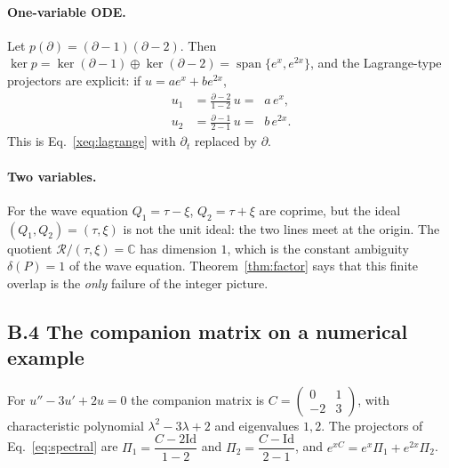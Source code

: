 \documentclass[11pt]{article}
\theoremstyle{plain}
\theoremstyle{definition}
\theoremstyle{remark}
\newcommand{\C}{\mathbb{C}}
\newcommand{\ring}{\mathcal{R}}            %
\DeclareMathOperator{\spn}{span}
\newcommand{\Id}{\mathrm{Id}}
\begin{document}
\paragraph{One-variable ODE.} Let $p(\partial)=(\partial-1)(\partial-2)$. Then $\ker p=\ker(\partial-1)\oplus\ker(\partial-2)=\spn\{e^x,e^{2x}\}$, and the Lagrange-type projectors are explicit: if $u=ae^x+be^{2x}$,
\[
\begin{aligned}
u_1&=\frac{\partial-2}{1-2}\,u=\;\;a\,e^{x},\\
u_2&=\frac{\partial-1}{2-1}\,u=\;\;b\,e^{2x}.
\end{aligned}
\]
This is Eq.~\eqref{xeq:lagrange} with $\partial_t$ replaced by $\partial$.

\paragraph{Two variables.} For the wave equation $Q_1=\tau-\xi$, $Q_2=\tau+\xi$ are coprime, but the ideal $(Q_1,Q_2)=(\tau,\xi)$ is not the unit ideal: the two lines meet at the origin. The quotient $\ring/(\tau,\xi)=\C$ has dimension $1$, which is the constant ambiguity $\delta(P)=1$ of the wave equation. Theorem~\ref{thm:factor} says that this finite overlap is the \emph{only} failure of the integer picture.

\subsection*{B.4 The companion matrix on a numerical example}
For $u''-3u'+2u=0$ the companion matrix is $C=\begin{pmatrix}0&1\\-2&3\end{pmatrix}$, with characteristic polynomial $\lambda^2-3\lambda+2$ and eigenvalues $1,2$. The projectors of Eq.~\eqref{eq:spectral} are $\Pi_1=\dfrac{C-2\Id}{1-2}$ and $\Pi_2=\dfrac{C-\Id}{2-1}$, and $e^{xC}=e^x\Pi_1+e^{2x}\Pi_2$.


\end{document}
